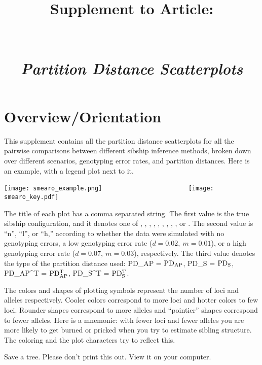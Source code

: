 \documentclass[11pt,landscape]{report}
\title{Supplement \SupNum{} to Article:\\
\ArticleName\\
\mbox{}\\
{\em Partition Distance Scatterplots} }
\begin{document}
\maketitle
\section{Overview/Orientation}
This supplement contains all the partition distance scatterplots for all the pairwise comparisons between different sibship inference methods, broken down over different scenarios, genotyping error rates, and partition distances. Here is an example, with a legend plot next to it.
\begin{center}
\texttt{[image: smearo\_example.png]}
~~~~~~~~~~~~~~~~~~~~~~~
\texttt{[image: smearo\_key.pdf]}
\end{center}
The title of each plot has a comma separated string.  The first value is the true sibship configuration, and it denotes one of 
\nosibs,
\allhalf,
\allpathalf,
\sfsnoh,
\sfswh,
\slfsgnoh,
\slfsgwh,
\onelargenoh,
\onelargewh, or
\lottalarge.
The second value is ``n'', ``l'', or ``h,'' according to whether the data were simulated with no genotyping errors, a low genotyping error rate ($d=0.02,~m=0.01$), or a high genotyping error rate ($d=0.07,~m=0.03$), respectively.
The third value denotes the type of the partition distance used: PD\_AP = $\mathrm{PD_{AP}}$, PD\_S = $\mathrm{PD_S}$, PD\_AP\^{}T = $\mathrm{PD_{AP}^T}$, PD\_S\^{}T = $\mathrm{PD_S^T}$.

The colors and shapes of plotting symbols represent the number of loci and alleles respectively.  Cooler colors correspond to more loci and hotter colors to few loci.  Rounder shapes correspond to more alleles and ``pointier'' shapes correspond to fewer alleles.  Here is a mnemonic: with fewer loci and fewer alleles you are more likely to get burned or pricked when you try to estimate sibling structure.  The coloring and the plot characters try to reflect this.  

Save a tree. Please don't print this out.  View it on your computer.
\newpage  
\tableofcontents

\newpage
\listoffigures


\end{document}
